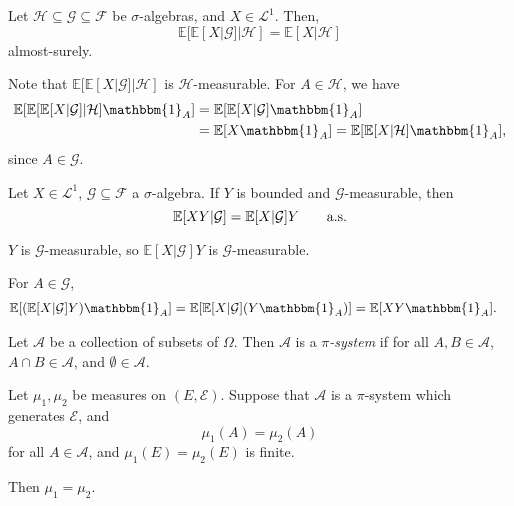 \documentclass[12pt]{article}
\begin{document}
\begin{proposition}
	Let $\mathcal{H} \subseteq \mathcal{G} \subseteq \mathcal{F}$ be $\sigma$-algebras, and $X \in \mathcal{L}^1$. Then,
	\[
	\mathbb{E}[\mathbb{E}[X | \mathcal{G}] | \mathcal{H}] = \mathbb{E}[X | \mathcal{H}]
	\]
	almost-surely.
\end{proposition}

\begin{proofbox}
	Note that $\mathbb{E}[\mathbb{E}[X|\mathcal{G}]|\mathcal{H}]$ is $\mathcal{H}$-measurable. For $A \in \mathcal{H}$, we have
	\begin{align*}
		\mathbb{E}[\mathbb{E}[\mathbb{E}[X | \mathcal{G}]|\mathcal{ H}] \mathbbm{1}_{A}] &= \mathbb{E}[\mathbb{E}[X | \mathcal{G}] \mathbbm{1}_{A}] \\
												 &= \mathbb{E}[X \mathbbm{1}_{A}] = \mathbb{E}[\mathbb{E}[X|\mathcal{H}]\mathbbm{1}_{A}],
	\end{align*}
	since $A \in \mathcal{G}$.
\end{proofbox}

\begin{proposition}
	Let $X \in \mathcal{L}^1$, $\mathcal{G} \subseteq \mathcal{F}$ a $\sigma$-algebra. If $Y$ is bounded and $\mathcal{G}$-measurable, then
	\[
		\mathbb{E}[XY|\mathcal{G}] = \mathbb{E}[X|\mathcal{G}] Y \qquad \text{\normalfont{a.s.}}
	\]
\end{proposition}

\begin{proofbox}
	$Y$ is $\mathcal{G}$-measurable, so $\mathbb{E}[X | \mathcal{G}]Y$ is $\mathcal{G}$-measurable.

	For $A \in \mathcal{G}$,
	\begin{align*}
		\mathbb{E}[(\mathbb{E}[X|\mathcal{G}]Y)\mathbbm{1}_{A}] &= \mathbb{E}[\mathbb{E}[X|\mathcal{G}](Y \mathbbm{1}_{A})] = \mathbb{E}[X Y \mathbbm{1}_{A}].
	\end{align*}
\end{proofbox}


\begin{definition}
	Let $\mathcal{A}$ be a collection of subsets of $\Omega$. Then $\mathcal{A}$ is a \emph{$\pi$-system} if for all $A, B \in \mathcal{A}$, $A \cap B \in \mathcal{A}$, and $\emptyset \in \mathcal{A}$.
\end{definition}

\begin{theorem}
	Let $\mu_1, \mu_2$ be measures on $(E, \mathcal{E})$. Suppose that $\mathcal{A}$ is a $\pi$-system which generates $\mathcal{E}$, and
	\[
	\mu_1(A) = \mu_2(A)
	\]
	for all $A \in \mathcal{A}$, and $\mu_1(E) = \mu_2(E)$ is finite.

	Then $\mu_1 = \mu_2$.
\end{theorem}
\end{document}
